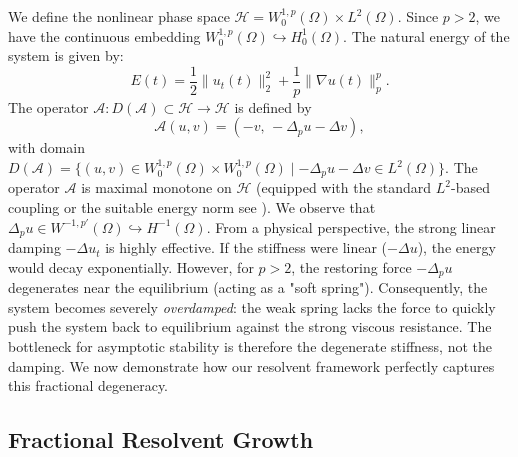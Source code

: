 \documentclass[11pt,reqno]{amsart}
\theoremstyle{remark}
\begin{document}
We define the nonlinear phase space $\mathcal{H} = W_0^{1,p}(\Omega) \times L^2(\Omega)$. Since $p > 2$, we have the continuous embedding $W_0^{1,p}(\Omega) \hookrightarrow H_0^1(\Omega)$.
The natural energy of the system is given by:
\[
    E(t) = \frac{1}{2}\|u_t(t)\|_2^2 + \frac{1}{p}\|\nabla u(t)\|_p^p.
\]
The operator $\mathcal{A}: D(\mathcal{A}) \subset \mathcal{H} \to \mathcal{H}$ is defined by
\[
    \mathcal{A}(u, v) = \left( -v, \, -\Delta_p u - \Delta v \right),
\]
with domain $D(\mathcal{A}) = \{ (u,v) \in W_0^{1,p}(\Omega) \times W_0^{1,p}(\Omega) \mid -\Delta_p u - \Delta v \in L^2(\Omega) \}$.
The operator $\mathcal{A}$ is maximal monotone on $\mathcal{H}$ (equipped with the standard $L^2$-based coupling or the suitable energy norm see \cite{Cavalcanti2025}). We observe that $\Delta_p u \in W^{-1,p'}(\Omega) \hookrightarrow H^{-1}(\Omega)$.
From a physical perspective, the strong linear damping $-\Delta u_t$ is highly effective. If the stiffness were linear ($-\Delta u$), the energy would decay exponentially. However, for $p > 2$, the restoring force $-\Delta_p u$ degenerates near the equilibrium (acting as a "soft spring"). Consequently, the system becomes severely \textit{overdamped}: the weak spring lacks the force to quickly push the system back to equilibrium against the strong viscous resistance. The bottleneck for asymptotic stability is therefore the degenerate stiffness, not the damping. We now demonstrate how our resolvent framework perfectly captures this fractional degeneracy.

\subsection{Fractional Resolvent Growth}
\end{document}
